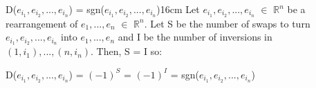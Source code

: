     \vspace{0.5cm}



    \begin{wtheorem}{D($e_{i_1},e_{i_2},...,e_{i_n}$)
    = sgn($e_{i_1},e_{i_2},...,e_{i_n}$)}{16cm}
        Let $e_{i_1},e_{i_2},...,e_{i_n}$ $\in$ $\mathbb{R}^n$
        be a rearrangement of $e_1,...,e_n$ $\in$ $\mathbb{R}^n$.
        Let S be the number of swaps to turn $e_{i_1},e_{i_2},...,e_{i_n}$
        into $e_1,...,e_n$ and I be the number of inversions
        in $(1,i_1),...,(n,i_n)$.
        Then, S = I so:

        \hspace{0.5cm}
        D($e_{i_1},e_{i_2},...,e_{i_n}$)
        = $(-1)^S$
        = $(-1)^I$
        = sgn($e_{i_1},e_{i_2},...,e_{i_n}$)
    \end{wtheorem}

